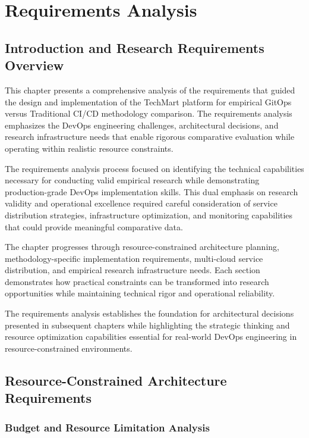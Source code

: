 \chapter{Requirements Analysis}

\section{Introduction and Research Requirements Overview}

This chapter presents a comprehensive analysis of the requirements that guided the design and implementation of the TechMart platform for empirical GitOps versus Traditional CI/CD methodology comparison. The requirements analysis emphasizes the DevOps engineering challenges, architectural decisions, and research infrastructure needs that enable rigorous comparative evaluation while operating within realistic resource constraints.

The requirements analysis process focused on identifying the technical capabilities necessary for conducting valid empirical research while demonstrating production-grade DevOps implementation skills. This dual emphasis on research validity and operational excellence required careful consideration of service distribution strategies, infrastructure optimization, and monitoring capabilities that could provide meaningful comparative data.

The chapter progresses through resource-constrained architecture planning, methodology-specific implementation requirements, multi-cloud service distribution, and empirical research infrastructure needs. Each section demonstrates how practical constraints can be transformed into research opportunities while maintaining technical rigor and operational reliability.

The requirements analysis establishes the foundation for architectural decisions presented in subsequent chapters while highlighting the strategic thinking and resource optimization capabilities essential for real-world DevOps engineering in resource-constrained environments.

\section{Resource-Constrained Architecture Requirements}

\subsection{Budget and Resource Limitation Analysis}

